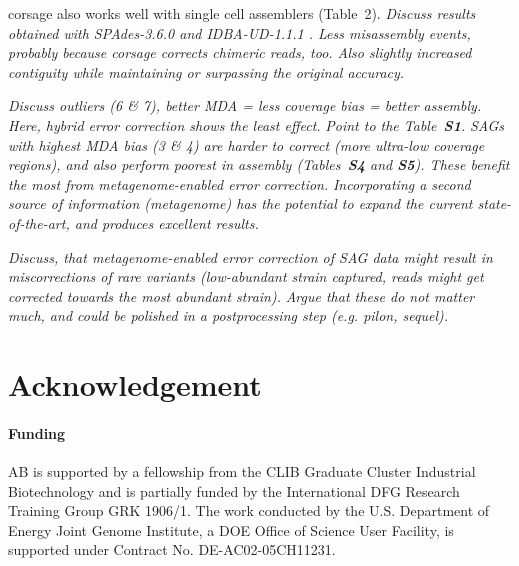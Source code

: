 \documentclass{bioinfo}
\begin{document}
corsage also works well with single cell assemblers (Table~2).
\textit{Discuss results obtained with SPAdes-3.6.0 \citep{spades1} and IDBA-UD-1.1.1 \citep{idba_ud}. Less misassembly events, probably because corsage corrects chimeric reads, too. Also slightly increased contiguity while maintaining or surpassing the original accuracy.}

\textit{Discuss outliers (6 \& 7), better MDA = less coverage bias = better assembly. Here, hybrid error correction shows the least effect.}
\textit{Point to the Table~\textbf{S1}.}
\textit{SAGs with highest MDA bias (3 \& 4) are harder to correct (more ultra-low coverage regions), and also perform poorest in assembly (Tables~\textbf{S4} and \textbf{S5}). These benefit the most from metagenome-enabled error correction.}
\textit{Incorporating a second source of information (metagenome) has the potential to expand the current state-of-the-art, and produces excellent results.}

\textit{Discuss, that metagenome-enabled error correction of SAG data might result in miscorrections of rare variants (low-abundant strain captured, reads might get corrected towards the most abundant strain).}
\textit{Argue that these do not matter much, and could be polished in a postprocessing step (e.g. pilon, sequel).}

\section*{Acknowledgement}
\paragraph{Funding\textcolon}
AB is supported by a fellowship from the CLIB Graduate Cluster Industrial Biotechnology and is partially funded by the International DFG Research Training Group GRK 1906/1.
The work conducted by the U.S. Department of Energy Joint Genome Institute, a DOE Office of Science User Facility, is supported under Contract No. DE-AC02-05CH11231.



\newpage

\end{document}

